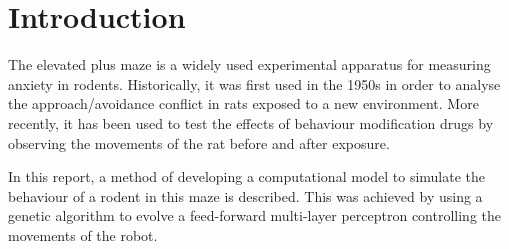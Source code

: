 \section{Introduction} %

The elevated plus maze is a widely used experimental apparatus for measuring anxiety in rodents. Historically, it was first used in the 1950s in order to analyse the approach/avoidance conflict in rats exposed to a new environment. More recently, it has been used to test the effects of behaviour modification drugs by observing the movements of the rat before and after exposure.

In this report, a method of developing a computational model to simulate the behaviour of a rodent in this maze is described. This was achieved by using a genetic algorithm to evolve a feed-forward multi-layer perceptron controlling the movements of the robot.


